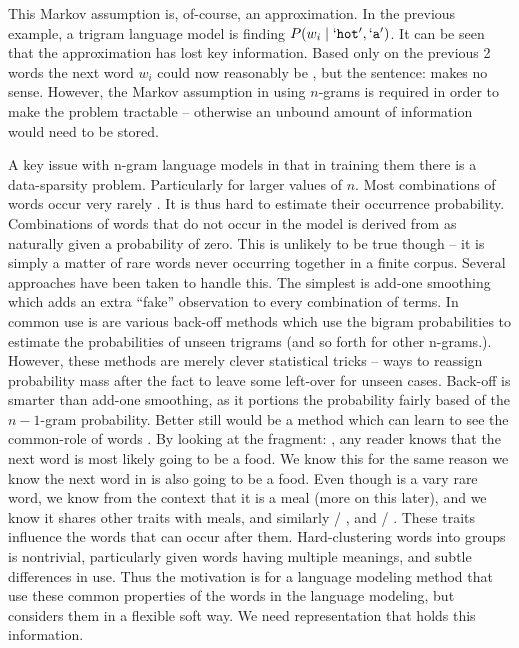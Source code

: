 \documentclass[parskip]{komatufte}
\begin{document}
This Markov assumption is, of-course, an approximation.
In the previous example, a trigram language model is finding $P(w_i \mid `\texttt{hot}', `\texttt{a}')$.
It can be seen that the approximation has lost key information.
Based only on the previous 2 words the next word $w_i$ could now reasonably be , but the sentence:  makes no sense.
However, the Markov assumption in using $n$-grams is required in order to make the problem tractable -- otherwise an unbound amount of information would need to be stored. 

A key issue with n-gram language models in that in training them there is a data-sparsity problem.
Particularly for larger values of $n$.
Most combinations of words occur very rarely .
It is thus hard to estimate their occurrence probability.
Combinations of words that do not occur in the model is derived from as naturally given a probability of zero.
This is unlikely to be true though -- it is simply a matter of rare words never occurring together in a finite corpus.
Several approaches have been taken to handle this.
The simplest is add-one smoothing which adds an extra ``fake'' observation to every combination of terms.
In common use is are various back-off methods  which use the bigram probabilities to estimate the probabilities of unseen trigrams (and so forth for other n-grams.).
%
%
However, these methods are merely clever statistical tricks -- ways to reassign probability mass after the fact to leave some left-over for unseen cases.
Back-off is smarter than add-one smoothing, as it portions the probability fairly based of the $n{-}1$-gram probability.
Better still would be a method which can learn to see the common-role of words .
By looking at the fragment: , any reader knows that the next word is most likely going to be a food.
We know this for the same reason we know the next word in  is also going to be a food.
Even though  is a vary rare word, we know from the context that it is a meal (more on this later), and we know it shares other traits with meals, and similarly  / , and  / .
These traits influence the words that can occur after them.
Hard-clustering words into groups is nontrivial, particularly given words having multiple meanings, and subtle differences in use.
Thus the motivation is for a language modeling method that use these common properties of the words in the language modeling, but considers them in a flexible soft way.
We need representation that holds this information.
\end{document}
